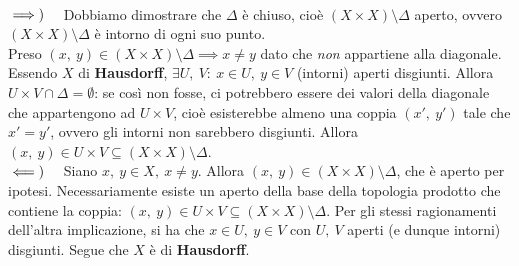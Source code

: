 \begin{demonstration}~{}\\
$\implies)\quad$ Dobbiamo dimostrare che $\Delta$ è chiuso, cioè $\left(X\times X\right)\setminus \Delta$ aperto, ovvero $\left(X\times X\right)\setminus \Delta$ è intorno di ogni suo punto.\\
Preso $\left(x,\ y\right)\in \left(X\times X\right)\setminus \Delta\implies x\neq y$ dato che \textit{non} appartiene alla diagonale. Essendo $X$ di \textbf{Hausdorff}, $\exists U,\ V:\ x\in U,\ y\in V$ (intorni) aperti  disgiunti. Allora $U\times V\cap \Delta =\emptyset$: se così non fosse, ci potrebbero essere dei valori della diagonale che appartengono ad $U\times V$, cioè esisterebbe almeno una coppia $\left(x',\ y'\right)$ tale che $x'=y'$, ovvero gli intorni non sarebbero disgiunti. Allora $\left(x,\ y\right)\in U\times V\subseteq \left(X\times X\right)\setminus \Delta$.\\
$\impliedby)\quad$ Siano $x,\ y\in X,\ x\neq y$. Allora $\left(x,\ y\right)\in \left(X\times X\right)\setminus \Delta$, che è aperto per ipotesi. Necessariamente esiste un aperto della base della topologia prodotto che contiene la coppia: $\left(x,\ y\right)\in U\times V\subseteq \left(X\times X\right)\setminus \Delta$. Per gli stessi ragionamenti dell'altra implicazione, si ha che $x\in U,\ y\in V$ con $U,\ V$ aperti (e dunque intorni) disgiunti. Segue che $X$ è di \textbf{Hausdorff}.
\end{demonstration}
